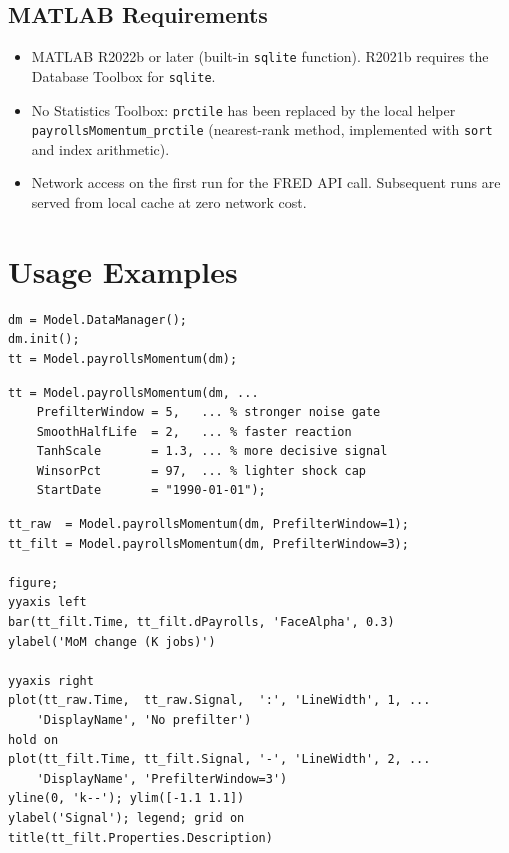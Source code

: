\documentclass[11pt, a4paper]{article}
\begin{document}
\subsection{MATLAB Requirements}
\begin{itemize}[leftmargin=2em]
  \item MATLAB R2022b or later (built-in \texttt{sqlite} function).
        R2021b requires the Database Toolbox for \texttt{sqlite}.
  \item No Statistics Toolbox: \texttt{prctile} has been replaced by
        the local helper \texttt{payrollsMomentum\_prctile} (nearest-rank
        method, implemented with \texttt{sort} and index arithmetic).
  \item Network access on the first run for the FRED API call.
        Subsequent runs are served from local cache at zero network cost.
\end{itemize}

\section{Usage Examples}
\label{sec:usage}

\begin{lstlisting}[style=matlab, caption={Minimal usage}]
dm = Model.DataManager();
dm.init();
tt = Model.payrollsMomentum(dm);
\end{lstlisting}

\begin{lstlisting}[style=matlab, caption={Custom parameters}]
tt = Model.payrollsMomentum(dm, ...
    PrefilterWindow = 5,   ... % stronger noise gate
    SmoothHalfLife  = 2,   ... % faster reaction
    TanhScale       = 1.3, ... % more decisive signal
    WinsorPct       = 97,  ... % lighter shock cap
    StartDate       = "1990-01-01");
\end{lstlisting}

\begin{lstlisting}[style=matlab, caption={Compare prefiltered vs.\ no prefilter}]
tt_raw  = Model.payrollsMomentum(dm, PrefilterWindow=1);
tt_filt = Model.payrollsMomentum(dm, PrefilterWindow=3);

figure;
yyaxis left
bar(tt_filt.Time, tt_filt.dPayrolls, 'FaceAlpha', 0.3)
ylabel('MoM change (K jobs)')

yyaxis right
plot(tt_raw.Time,  tt_raw.Signal,  ':', 'LineWidth', 1, ...
    'DisplayName', 'No prefilter')
hold on
plot(tt_filt.Time, tt_filt.Signal, '-', 'LineWidth', 2, ...
    'DisplayName', 'PrefilterWindow=3')
yline(0, 'k--'); ylim([-1.1 1.1])
ylabel('Signal'); legend; grid on
title(tt_filt.Properties.Description)
\end{lstlisting}
\end{document}
